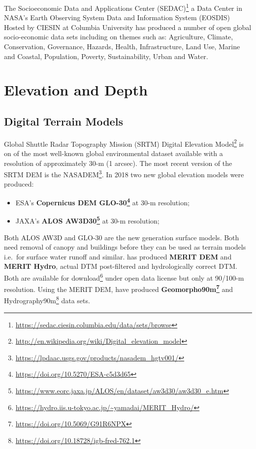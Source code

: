 \documentclass[
  graybox,natbib,nospthms]{svmono}
\providecommand{\tightlist}{%
  \setlength{\itemsep}{0pt}\setlength{\parskip}{0pt}}
\providecommand{\tightlist}{\setlength{\itemsep}{0pt}\setlength{\parskip}{0pt}}
\renewcommand{\href}[2]{#2 (\url{#1})}
\renewcommand{\href}[2]{#2\footnote{\url{#1}}}
\begin{document}
The \href{https://sedac.ciesin.columbia.edu/data/sets/browse}{Socioeconomic Data and Applications Center (SEDAC)} a Data Center in NASA's Earth
Observing System Data and Information System (EOSDIS) Hosted by CIESIN at Columbia University
has produced a number of open global socio-economic data sets including on themes such as: Agriculture, Climate, Conservation,
Governance, Hazards, Health, Infrastructure, Land Use, Marine and Coastal, Population,
Poverty, Sustainability, Urban and Water.

\hypertarget{elevation-and-depth}{%
\section{Elevation and Depth}\label{elevation-and-depth}}

\hypertarget{digital-terrain-models}{%
\subsection{Digital Terrain Models}\label{digital-terrain-models}}

Global Shuttle Radar Topography Mission (SRTM) \href{http://en.wikipedia.org/wiki/Digital_elevation_model}{Digital Elevation Model} is
on of the most well-known global environmental dataset \citep{rabus2003shuttle}
available with a resolution of approximately 30-m (1 arcsec). The most recent
version of the SRTM DEM is the \href{https://lpdaac.usgs.gov/products/nasadem_hgtv001/}{NASADEM}.
In 2018 two new global elevation models were produced:

\begin{itemize}
\tightlist
\item
  ESA's \textbf{\href{https://doi.org/10.5270/ESA-c5d3d65}{Copernicus DEM GLO-30}} at 30-m resolution;
\item
  JAXA's \textbf{\href{https://www.eorc.jaxa.jp/ALOS/en/dataset/aw3d30/aw3d30_e.htm}{ALOS AW3D30}} at 30-m resolution;
\end{itemize}

Both ALOS AW3D and GLO-30 are the new generation surface models. Both need removal
of canopy and buildings before they can be used as terrain models i.e.~for surface water runoff and similar.
\citet{MERITDEM} has produced \textbf{MERIT DEM} and \textbf{MERIT Hydro}, actual DTM post-filtered and hydrologically
correct DTM. Both are available for \href{https://hydro.iis.u-tokyo.ac.jp/~yamadai/MERIT_Hydro/}{download} under open data license but only at 90/100-m resolution. Using the MERIT DEM, \citet{amatulli2020geomorpho90m} have produced \textbf{\href{https://doi.org/10.5069/G91R6NPX}{Geomorpho90m}} and
\href{https://doi.org/10.18728/igb-fred-762.1}{Hydrography90m} \citep{amatulli2022hydrography90m} data sets.
\end{document}
